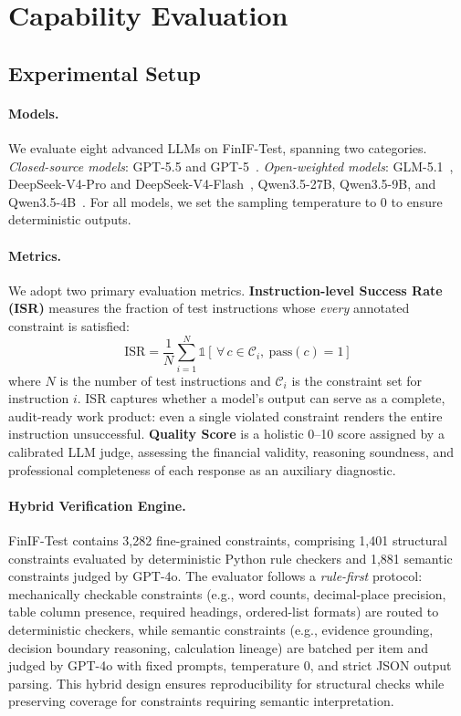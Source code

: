 \section{Capability Evaluation}

\subsection{Experimental Setup}

\paragraph{Models.}
We evaluate eight advanced LLMs on FinIF-Test, spanning two categories.
\textit{Closed-source models}: GPT-5.5 and GPT-5~\cite{openai2025gpt5}.
\textit{Open-weighted models}: GLM-5.1~\cite{glm2025chatglm}, DeepSeek-V4-Pro and DeepSeek-V4-Flash~\cite{deepseek2025v4}, Qwen3.5-27B, Qwen3.5-9B, and Qwen3.5-4B~\cite{qwen2025qwen3}.
For all models, we set the sampling temperature to 0 to ensure deterministic outputs.

\paragraph{Metrics.}
We adopt two primary evaluation metrics.
\textbf{Instruction-level Success Rate (ISR)} measures the fraction of test instructions whose \emph{every} annotated constraint is satisfied:
\begin{equation}
\text{ISR} = \frac{1}{N}\sum_{i=1}^{N} \mathbb{1}\!\left[\,\forall\, c \in \mathcal{C}_i,\ \text{pass}(c) = 1\right]
\label{eq:isr}
\end{equation}
where $N$ is the number of test instructions and $\mathcal{C}_i$ is the constraint set for instruction $i$.
ISR captures whether a model's output can serve as a complete, audit-ready work product: even a single violated constraint renders the entire instruction unsuccessful.
\textbf{Quality Score} is a holistic 0--10 score assigned by a calibrated LLM judge, assessing the financial validity, reasoning soundness, and professional completeness of each response as an auxiliary diagnostic.

\paragraph{Hybrid Verification Engine.}
FinIF-Test contains 3,282 fine-grained constraints, comprising 1,401 structural constraints evaluated by deterministic Python rule checkers and 1,881 semantic constraints judged by GPT-4o.
The evaluator follows a \emph{rule-first} protocol: mechanically checkable constraints (e.g., word counts, decimal-place precision, table column presence, required headings, ordered-list formats) are routed to deterministic checkers, while semantic constraints (e.g., evidence grounding, decision boundary reasoning, calculation lineage) are batched per item and judged by GPT-4o with fixed prompts, temperature 0, and strict JSON output parsing.
This hybrid design ensures reproducibility for structural checks while preserving coverage for constraints requiring semantic interpretation.


